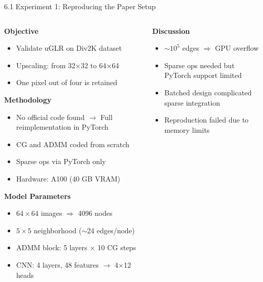\documentclass[aspectratio=169,xcolor=dvipsnames]{beamer}
\begin{document}
\begin{frame}{6.1 Experiment 1: Reproducing the Paper Setup}
\footnotesize %

\begin{columns}[T] %

\begin{column}{0.55\textwidth}

\textbf{Objective}
\vspace{-0.1cm}
\begin{itemize}
    \setlength\itemsep{2pt}
    \item Validate uGLR on Div2K dataset
    \item Upscaling: from 32×32 to 64×64
    \item One pixel out of four is retained
\end{itemize}

\textbf{Methodology}
\vspace{-0.1cm}
\begin{itemize}
    \setlength\itemsep{2pt}
    \item No official code found  
    $\rightarrow$ Full reimplementation in PyTorch
    \item CG and ADMM coded from scratch
    \item Sparse ops via PyTorch only
    \item Hardware: A100 (40 GB VRAM)
\end{itemize}

\textbf{Model Parameters}
\vspace{-0.1cm}
\begin{itemize}
    \setlength\itemsep{2pt}
    \item $64 \times 64$ images $\Rightarrow$ 4096 nodes
    \item $5 \times 5$ neighborhood ($\sim$24 edges/node)
    \item ADMM block: 5 layers × 10 CG steps
    \item CNN: 4 layers, 48 features $\rightarrow$ 4×12 heads
\end{itemize}

\end{column}

\begin{column}{0.50\textwidth}

\textbf{Discussion}
\vspace{-0.1cm}
\begin{itemize}
    \setlength\itemsep{2pt}
    \item $\sim10^5$ edges $\Rightarrow$ GPU overflow
    \item Sparse ops needed but PyTorch support limited
    \item Batched design complicated sparse integration
    \item Reproduction failed due to memory limits
\end{itemize}


\end{column}
\end{columns}
\end{frame}
\end{document}
